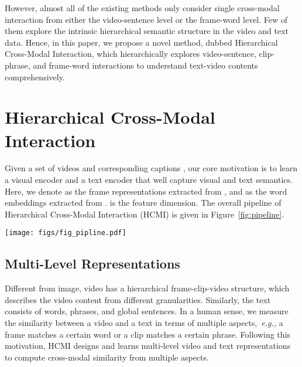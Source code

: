 \documentclass{article}
\begin{document}
However, almost all of the existing methods only consider single cross-modal interaction from either the video-sentence level or the frame-word level. Few of them explore the intrinsic hierarchical semantic structure in the video and text data. Hence, in this paper, we propose a novel method, dubbed Hierarchical Cross-Modal Interaction, which hierarchically explores video-sentence, clip-phrase, and frame-word interactions to understand text-video contents comprehensively.


\section{Hierarchical Cross-Modal Interaction}
Given a set of videos  and corresponding captions , our core motivation is to learn a visual encoder  and a text encoder  that well capture visual and text semantics. 
Here, we denote  as the  frame representations extracted from , and  as the  word embeddings extracted from .
 is the feature dimension.
The overall pipeline of Hierarchical Cross-Modal Interaction (HCMI) is given in Figure~\ref{fig:pipeline}.

\begin{figure*}[h]
    \centering
    \texttt{[image: figs/fig\_pipline.pdf]}
    \caption{The pipeline of the proposed method. Given hierarchical visual and text features, HCMI first produces text-video pair labels via the adaptive label denoising strategy. Besides, the hard negative samples will be selected according to text-video matching scores. Then, the produced text-video labels and hard negative samples are sent to the hierarchical cross-modal contrastive loss and triplet loss, respectively. 
    }
    \label{fig:pipeline}
\end{figure*}

\subsection{Multi-Level Representations}
Different from image, video has a hierarchical frame-clip-video structure, which describes the video content from different granularities.
Similarly, the text consists of words, phrases, and global sentences.
In a human sense, we measure the similarity between a video and a text in terms of multiple aspects,~\emph{e.g.,} a frame matches a certain word or a clip matches a certain phrase.
Following this motivation, HCMI designs and learns multi-level video and text representations to compute cross-modal similarity from multiple aspects.
\end{document}
